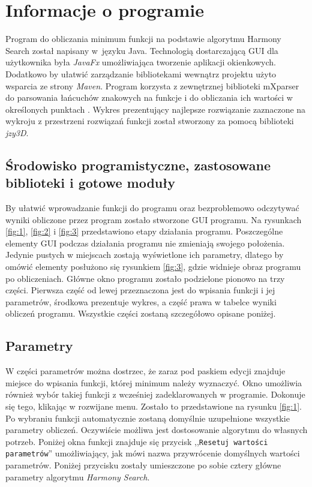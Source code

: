 \documentclass[10pt, a4paper]{article}
\begin{document}
\pagebreak

\section{Informacje o programie}
\label{sec:implementacja}
Program do obliczania minimum funkcji na podstawie algorytmu Harmony Search został napisany w~języku Java. Technologią dostarczającą GUI dla użytkownika była {\em JavaFx} umożliwiająca tworzenie aplikacji okienkowych. Dodatkowo by ułatwić zarządzanie bibliotekami wewnątrz projektu użyto wsparcia ze strony {\em Maven}.  Program korzysta z zewnętrznej biblioteki mXparser do parsowania łańcuchów znakowych na funkcje i do obliczania ich wartości w określonych punktach \cite{bib:mathparser}. Wykres prezentujący najlepsze rozwiązanie zaznaczone na wykroju z przestrzeni rozwiązań funkcji został stworzony za pomocą biblioteki {\em jzy3D}.

\subsection{Środowisko programistyczne, zastosowane biblioteki i gotowe moduły}
\label{subsec:gui}
By ułatwić wprowadzanie funkcji do programu oraz bezproblemowo odczytywać wyniki obliczone przez program zostało stworzone GUI programu. Na rysunkach \ref{fig:1}, \ref{fig:2} i \ref{fig:3} przedstawiono etapy działania programu. Poszczególne elementy GUI podczas działania programu nie zmieniają swojego położenia. Jedynie pustych w miejscach zostają wyświetlone ich parametry, dlatego by omówić elementy posłużono się rysunkiem \ref{fig:3}, gdzie widnieje obraz programu po obliczeniach. Główne okno programu zostało podzielone pionowo na trzy części. Pierwsza część od lewej przeznaczona jest do wpisania funkcji i jej parametrów, środkowa prezentuje wykres, a część prawa w tabelce wyniki obliczeń programu. Wszystkie części zostaną szczegółowo opisane poniżej.

\subsection{Parametry}
\label{subsec:parametry}
W części parametrów można dostrzec, że zaraz pod paskiem edycji znajduje miejsce do wpisania funkcji, której minimum należy wyznaczyć. Okno umożliwia również wybór takiej funkcji z wcześniej zadeklarowanych w programie. Dokonuje się tego, klikając w rozwijane menu. Zostało to przedstawione na rysunku \ref{fig:1}. Po wybraniu funkcji automatycznie zostaną domyślnie uzupełnione wszystkie parametry obliczeń. Oczywiście możliwa jest dostosowanie algorytmu do własnych potrzeb. Poniżej okna funkcji znajduje się przycisk ,,{\tt Resetuj wartości parametrów}'' umożliwiający, jak mówi nazwa przywrócenie domyślnych wartości parametrów. Poniżej przycisku zostały umieszczone po sobie cztery główne parametry algorytmu {\em Harmony Search}. 
\end{document}
